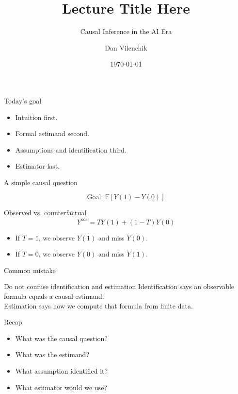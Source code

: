 \documentclass[aspectratio=169]{beamer}
\title[Causal Inference]{Lecture Title Here}
\subtitle{Causal Inference in the AI Era}
\author{Dan Vilenchik}
\institute{Ben-Gurion University of the Negev}
\date{\today}
\newcommand{\E}{\mathbb{E}}
\begin{document}
\begin{frame}
  \titlepage
\end{frame}

\begin{frame}{Today’s goal}
\begin{itemize}
  \item Intuition first.
  \item Formal estimand second.
  \item Assumptions and identification third.
  \item Estimator last.
\end{itemize}
\end{frame}

\begin{frame}{A simple causal question}
\begin{center}
\end{center}

\[
\text{Goal: } \E[Y(1)-Y(0)]
\]
\end{frame}

\begin{frame}{Observed vs. counterfactual}
\[
Y^{obs}=T Y(1)+(1-T)Y(0)
\]

\begin{itemize}
  \item If $T=1$, we observe $Y(1)$ and miss $Y(0)$.
  \item If $T=0$, we observe $Y(0)$ and miss $Y(1)$.
\end{itemize}
\end{frame}

\begin{frame}{Common mistake}
\begin{block}{Do not confuse identification and estimation}
Identification says an observable formula equals a causal estimand.\\
Estimation says how we compute that formula from finite data.
\end{block}
\end{frame}

\begin{frame}{Recap}
\begin{itemize}
  \item What was the causal question?
  \item What was the estimand?
  \item What assumption identified it?
  \item What estimator would we use?
\end{itemize}
\end{frame}
\end{document}
